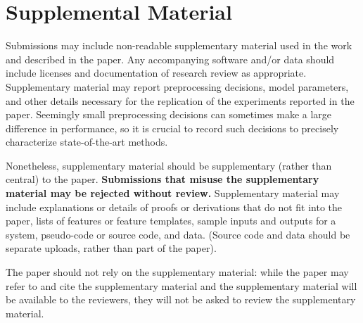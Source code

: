 \documentclass[11pt,a4paper]{article}
\begin{document}
\section{Supplemental Material}
\label{sec:supplemental}
Submissions may include non-readable supplementary material used in the work and described in the paper. Any accompanying software and/or data should include licenses and documentation of research review as appropriate. Supplementary material may report preprocessing decisions, model parameters, and other details necessary for the replication of the experiments reported in the paper. Seemingly small preprocessing decisions can sometimes make a large difference in performance, so it is crucial to record such decisions to precisely characterize state-of-the-art methods. 

Nonetheless, supplementary material should be supplementary (rather
than central) to the paper. {\bf Submissions that misuse the supplementary 
material may be rejected without review.}
Supplementary material may include explanations or details
of proofs or derivations that do not fit into the paper, lists of
features or feature templates, sample inputs and outputs for a system,
pseudo-code or source code, and data. (Source code and data should
be separate uploads, rather than part of the paper).

The paper should not rely on the supplementary material: while the paper
may refer to and cite the supplementary material and the supplementary material will be available to the
reviewers, they will not be asked to review the
supplementary material.
\end{document}
